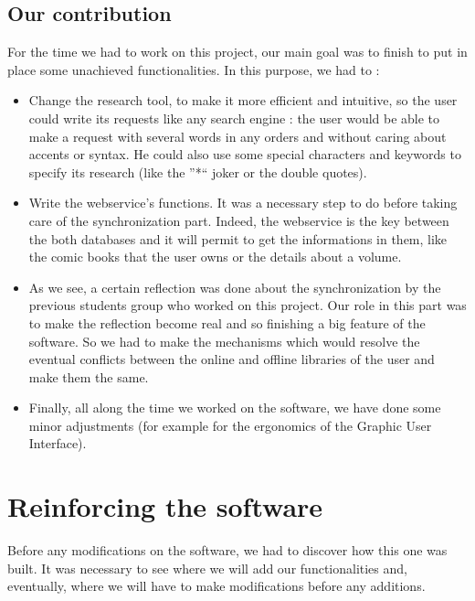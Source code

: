 \documentclass[11pt]{report} %
\begin{document}
\section{Our contribution}
For the time we had to work on this project, our main goal was to finish to put in place some unachieved functionalities. In this purpose, we had to :
\begin{itemize}
\item Change the research tool, to make it more efficient and intuitive, so the user could write its requests like any search engine : the user would be able to make a request with several words in any orders and without caring about accents or syntax. He could also use some special characters and keywords to specify its research (like the ''*`` joker or the double quotes).
\item Write the webservice's functions. It was a necessary step to do before taking care of the synchronization part. Indeed, the webservice is the key between the both databases and it will permit to get the informations in them, like the comic books that the user owns or the details about a volume.
\item As we see, a certain reflection was done about the synchronization by the previous students group who worked on this project. Our role in this part was to make the reflection become real and so finishing a big feature of the software. So we had to make the mechanisms which would resolve the eventual conflicts between the online and offline libraries of the user and make them the same.
\item Finally, all along the time we worked on the software, we have done some minor adjustments (for example for the ergonomics of the Graphic User Interface).

\end{itemize}


%
% 

\chapter{Reinforcing the software}
Before any modifications on the software, we had to discover how this one was built. It was necessary to see where we will add our functionalities and, eventually, where we will have to make modifications before any additions.
\end{document}
